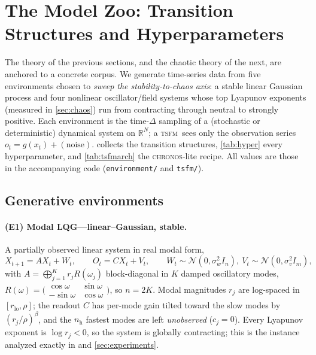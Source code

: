 \documentclass[10pt]{article}
\theoremstyle{plain}
\theoremstyle{definition}
\theoremstyle{remark}
\newcommand{\R}{\mathbb{R}}
\newcommand{\TSFM}{\textsc{tsfm}}
\newcommand{\Chronos}{\textsc{chronos}}
\begin{document}
\section{The Model Zoo: Transition Structures and Hyperparameters}
\label{sec:zoo}

The theory of the previous sections, and the chaotic theory of the next, are
anchored to a concrete corpus. We generate time-series data from five
environments chosen to \emph{sweep the stability-to-chaos axis}: a stable linear
Gaussian process and four nonlinear oscillator/field systems whose top Lyapunov
exponents (measured in \cref{sec:chaos}) run from contracting through neutral to
strongly positive. Each environment is the time-$\Delta$ sampling of a (stochastic
or deterministic) dynamical system on $\R^N$; a \TSFM\ sees only the observation
series $o_t=g(x_t)+(\text{noise})$.  collects the transition
structures, \cref{tab:hyper} every hyperparameter, and \cref{tab:tsfmarch} the
\Chronos-lite recipe. All values are those in the accompanying code
(\texttt{environment/} and \texttt{tsfm/}).

\subsection{Generative environments}

\paragraph{(E1) Modal LQG---linear--Gaussian, stable.}
A partially observed linear system in real modal form,
\begin{equation}
 X_{t+1}=A X_t+W_t,\qquad O_t=C X_t+V_t,\qquad
 W_t\sim\mathcal N(0,\sigma_w^2 I_n),\ V_t\sim\mathcal N(0,\sigma_v^2 I_m),
 \label{eq:lqgzoo}
\end{equation}
with $A=\bigoplus_{j=1}^{K} r_j R(\omega_j)$ block-diagonal in $K$ damped
oscillatory modes, $R(\omega)=\bigl(\begin{smallmatrix}\cos\omega &
\sin\omega\\[-1pt] -\sin\omega & \cos\omega\end{smallmatrix}\bigr)$, so $n=2K$.
Modal magnitudes $r_j$ are log-spaced in $[r_{\mathrm{lo}},\rho]$; the readout $C$
has per-mode gain tilted toward the slow modes by $(r_j/\rho)^{\beta}$, and the
$n_{\mathrm{h}}$ fastest modes are left \emph{unobserved} ($c_j=0$). Every
Lyapunov exponent is $\log r_j<0$, so the system is globally contracting; this is
the instance analyzed exactly in  and
\cref{sec:experiments}.
\end{document}
